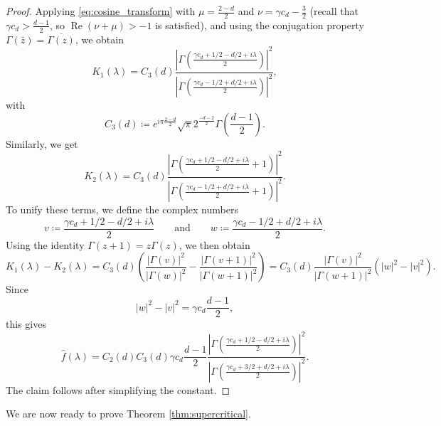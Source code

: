 \documentclass[11pt,a4paper]{article}
\theoremstyle{plain}
\theoremstyle{definition}
\theoremstyle{remark}
\DeclareMathOperator{\re}{Re}
\begin{document}
\begin{proof}
Applying \eqref{eq:cosine_transform} with $\mu = \frac{2-d}{2}$ and $\nu = \gamma c_d - \frac{3}{2}$ (recall that $\gamma c_d > \frac{d-1}{2}$, so $\re(\nu+\mu)>-1$ is satisfied), and using the conjugation property $\Gamma(\bar z)=\overline{\Gamma(z)}$, we obtain
\[
K_1(\lambda) = C_3(d) \frac{\left| \Gamma\left(\frac{\gamma c_d + 1/2 - d/2 + i\lambda}{2}\right) \right|^2}{\left| \Gamma\left(\frac{\gamma c_d -1/2 + d/2 + i\lambda}{2}\right) \right|^2},\]
with
\[ C_3(d) \coloneqq e^{i\pi\frac{2-d}{2}} \sqrt{\pi} 2^{\frac{-d-2}{2}} \Gamma\left( \frac{d-1}{2} \right). \]
Similarly, we get
\[
K_2(\lambda) = C_3(d) \frac{\left| \Gamma\left(\frac{\gamma c_d + 1/2 - d/2 + i\lambda}{2} +1 \right) \right|^2}{\left| \Gamma\left(\frac{\gamma c_d -1/2 + d/2 + i\lambda}{2} +1\right) \right|^2}.
\]
To unify these terms, we define the complex numbers 
\[
v \coloneqq \frac{\gamma c_d + 1/2 - d/2 + i\lambda}{2} \qquad \text{and} \qquad w \coloneqq \frac{\gamma c_d -1/2 + d/2 + i\lambda}{2}.
\]
Using the identity $\Gamma(z+1) = z \Gamma(z)$, we then obtain
\[ K_1(\lambda) - K_2(\lambda) 
= C_3(d) \left( \frac{|\Gamma(v)|^2}{|\Gamma(w)|^2} - \frac{|\Gamma(v+1)|^2}{|\Gamma(w+1)|^2} \right) 
= C_3(d) \frac{|\Gamma(v)|^2}{|\Gamma(w+1)|^2} \left(|w|^2 - |v|^2\right). \]
Since
\[ |w|^2 - |v|^2 = \gamma c_d\frac{d-1}{2}, \]
this gives
\[
\widehat{f}(\lambda) = C_2(d) C_3(d) \gamma c_d\frac{d-1}{2} \frac{\left|\Gamma\left(\frac{\gamma c_d + 1/2 -d/2 +i\lambda}{2}\right)\right|^2}{\left|\Gamma\left(\frac{\gamma c_d + 3/2 +d/2 +i\lambda}{2}\right)\right|^2}.
\]
The claim follows after simplifying the constant.
\end{proof}

We are now ready to prove Theorem \ref{thm:supercritical}.
\end{document}
